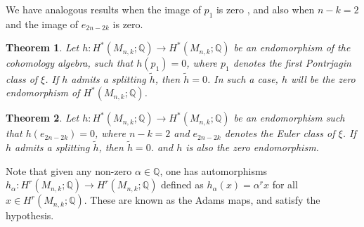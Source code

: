 \documentclass[a4paper,leqno,12pt]{amsart}
\theoremstyle{plain}
\newtheorem{thm}{Theorem}[section]
\theoremstyle{definition}
\theoremstyle{remark}
\newcommand{\Q}{\mathbb{Q}}
\begin{document}
\noindent 
We have analogous results when the image of $p_{1}$  is zero ,   and also when $n-k=2$ and the image of $e_{2n-2k}$ is zero.  \\

\begin{thm} \label{prop64}
Let $h:H^{*}(M_{n,k}; \Q) \to H^{*}(M_{n,k}; \Q)$  be an endomorphism of the cohomology algebra,  such that $h(p_{1})=0$,  where $p_{1}$ denotes the first Pontrjagin class of $\xi$.  If $h$ admits a splitting $\widetilde{h}$,   then $\widetilde{h} =0$.  In such a case,  $h$ will be the zero endomorphism of $H^{*}(M_{n,k};\Q)$.\\
\end{thm}

\begin{thm}\label{prop65}
Let $h:H^{*}(M_{n,k}; \Q) \to H^{*}(M_{n,k}; \Q)$  be an endomorphism  such that $h(e_{2n-2k})=0$,  where $n-k=2$ and $e_{2n-2k}$ denotes the Euler class of $\xi$.   If $h$ admits a splitting $\widetilde{h}$,   then $\widetilde{h} =0$.  and $h$ is also the zero endomorphism. 
\end{thm}

\noindent
Note that given any non-zero $\alpha\in \Q$, one has automorphisms $h_{\alpha} \colon H^r(M_{n,k}; \Q) \rightarrow H^r(M_{n,k}; \Q)$ defined as $h_{\alpha}(x)=\alpha^r x$ for all $x\in H^r(M_{n,k}; \Q)$. These are known as the Adams maps,  and satisfy the hypothesis. \\
\end{document}
